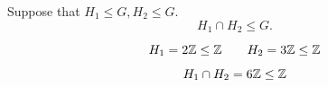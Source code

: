 \begin{frame}
  \begin{theorem}
    Suppose that $H_{1} \le G, H_{2} \le G$.
    \[
      H_{1} \cap H_{2} \le G.
    \]
  \end{theorem}

  \pause
  \[
    H_{1} = 2\mathbb{Z} \le \mathbb{Z} \qquad H_{2} = 3\mathbb{Z} \le \mathbb{Z}
  \]

  \[
    H_{1} \cap H_{2} = 6\mathbb{Z} \le \mathbb{Z}
  \]

\end{frame}

